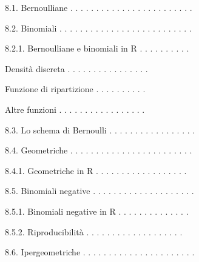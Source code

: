 \documentclass[a4paper,portrait,12pt]{article}
\begin{document}
\begin{flushleft}
8.1. Bernoulliane . . . . . . . . . . . . . . . . . . . . . . . .
\end{flushleft}


\begin{flushleft}
8.2. Binomiali . . . . . . . . . . . . . . . . . . . . . . . . . .
\end{flushleft}


\begin{flushleft}
8.2.1. Bernoulliane e binomiali in R . . . . . . . . . .
\end{flushleft}


\begin{flushleft}
Densit\`{a} discreta . . . . . . . . . . . . . . . .
\end{flushleft}


\begin{flushleft}
Funzione di ripartizione . . . . . . . . . .
\end{flushleft}


\begin{flushleft}
Altre funzioni . . . . . . . . . . . . . . . . .
\end{flushleft}


\begin{flushleft}
8.3. Lo schema di Bernoulli . . . . . . . . . . . . . . . . .
\end{flushleft}


\begin{flushleft}
8.4. Geometriche . . . . . . . . . . . . . . . . . . . . . . . .
\end{flushleft}


\begin{flushleft}
8.4.1. Geometriche in R . . . . . . . . . . . . . . . . . .
\end{flushleft}


\begin{flushleft}
8.5. Binomiali negative . . . . . . . . . . . . . . . . . . . .
\end{flushleft}


\begin{flushleft}
8.5.1. Binomiali negative in R . . . . . . . . . . . . . .
\end{flushleft}


\begin{flushleft}
8.5.2. Riproducibilit\`{a} . . . . . . . . . . . . . . . . . . .
\end{flushleft}


\begin{flushleft}
8.6. Ipergeometriche . . . . . . . . . . . . . . . . . . . . . .
\end{flushleft}
\end{document}
